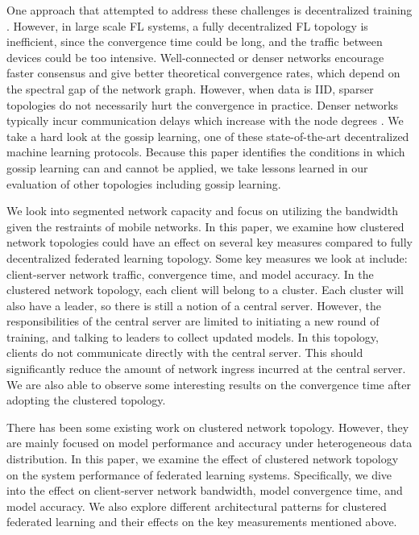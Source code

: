 \documentclass[10pt,twocolumn,letterpaper]{article}
\theoremstyle{definition}
\begin{document}
One approach that attempted to address these challenges is decentralized training \cite{2016arXiv160205629B,2017arXiv170509056L,2018arXiv180307068T,2016arXiv161005202V}. However, in large scale FL systems, a fully decentralized FL topology is inefficient, since the convergence time could be long, and the traffic between devices could be too intensive. Well-connected or denser networks encourage faster consensus and give better theoretical convergence rates, which depend on the spectral gap of the network graph. However, when data is IID, sparser topologies do not necessarily hurt the convergence in practice. Denser networks typically incur communication delays which increase with the node degrees \cite{2019arXiv191204977K}. 
We take a hard look at the gossip learning, one of these state-of-the-art decentralized machine learning protocols. Because this paper identifies the conditions in which gossip learning can and cannot be applied, we take lessons learned in our evaluation of other topologies including gossip learning.

We look into segmented network capacity and focus on utilizing the bandwidth given the restraints of mobile networks.
In this paper, we examine how clustered network topologies could have an effect on several key measures compared to fully decentralized federated learning topology. Some key measures we look at include: client-server network traffic, convergence time, and model accuracy. In the clustered network topology, each client will belong to a cluster. Each cluster will also have a leader, so there is still a notion of a central server. However, the responsibilities of the central server are limited to initiating a new round of training, and talking to leaders to collect updated models. In this topology, clients do not communicate directly with the central server. This should significantly reduce the amount of network ingress incurred at the central server. We are also able to observe some interesting results on the convergence time after adopting the clustered topology. 

There has been some existing work \cite{9207469,2019arXiv190606629G,9174890,9016505} on clustered network topology. However, they are mainly focused on model performance and accuracy under heterogeneous data distribution. In this paper, we examine the effect of clustered network topology on the system performance of federated learning systems. Specifically, we dive into the effect on client-server network bandwidth, model convergence time, and model accuracy. We also explore different architectural patterns for clustered federated learning and their effects on the key measurements mentioned above.
\end{document}
